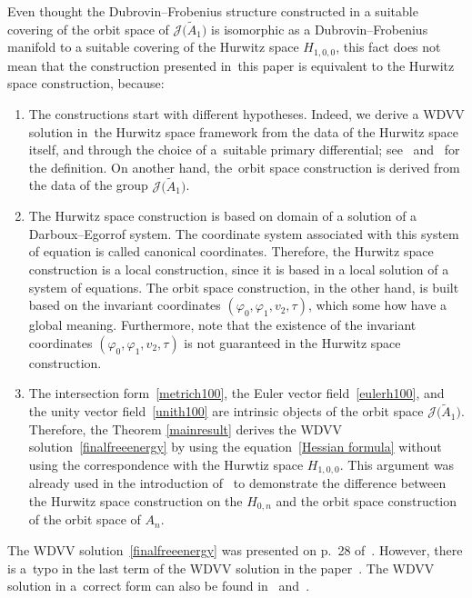 \documentclass[10pt,a4paper]{amsart}
\numberwithin{equation}{section}
\newcommand{\Ja}{\mathcal{J}}
\begin{document}
\begin{Remark}
Even thought the Dubrovin--Frobenius structure constructed in a suitable covering of the orbit space of $\Ja\big(\tilde A_1\big)$ is isomorphic as a Dubrovin--Frobenius manifold to a suitable covering of the Hurwitz space $H_{1,0,0}$, this fact does not mean that the construction presented in~this paper is equivalent to the Hurwitz space construction, because:
\begin{enumerate}\itemsep=0pt
\item The constructions start with different hypotheses. Indeed, we derive a WDVV solution in~the Hurwitz space framework from the data of the Hurwitz space itself, and through the choice of a~suitable primary differential; see~\cite{B.Dubrovin2} and~\cite{V.Shramchenko} for the definition. On another hand, the~orbit space construction is derived from the data of the group $\Ja\big(\tilde A_1\big)$.
\item The Hurwitz space construction is based on domain of a solution of a Darboux--Egorrof system. The coordinate system associated with this system of equation is called canonical coordinates. Therefore, the Hurwitz space construction is a local construction, since it is based in a local solution of a system of equations. The orbit space construction, in the other hand, is built based on the invariant coordinates $(\varphi_0,\varphi_1, v_2, \tau)$, which some how have a global meaning. Furthermore, note that the existence of the invariant coordinates $(\varphi_0,\varphi_1, v_2, \tau)$ is not guaranteed in the Hurwitz space construction.
\item The intersection form~\eqref{metrich100}, the Euler vector field~\eqref{eulerh100}, and the unity vector field~\eqref{unith100} are intrinsic objects of the orbit space $\Ja\big(\tilde A_1\big)$. Therefore, the Theorem \ref{mainresult} derives the WDVV solution~\eqref{finalfreeenergy} by using the equation~\eqref{Hessian formula} without using the correspondence with the Hurwtiz space $H_{1,0,0}$. This argument was already used in the introduction of~\cite{B.Dubrovin1} to demonstrate the difference between the Hurwitz space construction on the $H_{0,n}$ and the orbit space construction of the orbit space of $A_n$.
\end{enumerate}
\end{Remark}

\begin{Remark}
The WDVV solution~\eqref{finalfreeenergy} was presented on p.~28 of~\cite{Dubrovin3}. However, there is a~typo in the last term of the WDVV solution in the paper~\cite{Dubrovin3}. The WDVV solution in a~correct form can also be found in~\cite{M.CutimancoandV.Shramchenko} and~\cite{E.V.FerapontovM.V.PavlovL.Xue}.
\end{Remark}
\end{document}

